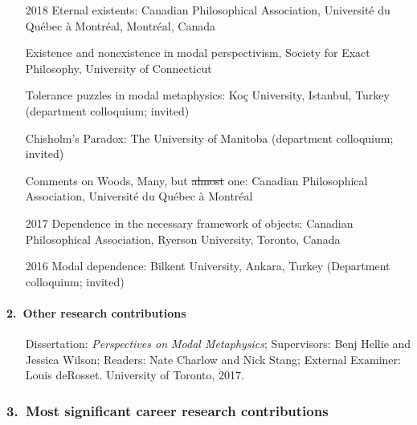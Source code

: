\documentclass[12pt]{article}
\begin{document}
\begin{itemize}
\item[{2018}] Eternal existents: Canadian Philosophical Association,
Universit\'e du Qu\'ebec \`a Montr\'eal, Montr\'eal, Canada 

\item[{\phantom}] Existence and nonexistence in modal perspectivism,
Society for Exact Philosophy, University of Connecticut

\item[{\phantom}] Tolerance puzzles in modal metaphysics: Ko\c c University,
Istanbul, Turkey (department colloquium; invited)

\item[{\phantom}] Chisholm's Paradox: The University of Manitoba
(department colloquium; invited)

\item[{\phantom}]  Comments on Woods, Many, but \st{almost} one: Canadian Philosophical
	Association, Universit\'e du Qu\'ebec \`a Montr\'eal  


\item [{2017}]  Dependence in the necessary framework of objects:
Canadian Philosophical Association, Ryerson University, Toronto, Canada  

\item [{2016}] Modal dependence: Bilkent University, Ankara, Turkey (Department
colloquium; invited) 

\end{itemize}

\paragraph{2.\ \quad Other research contributions}

\begin{itemize}

\item[] Dissertation: \emph{Perspectives on Modal Metaphysics}; Supervisors:
Benj Hellie and Jessica Wilson; Readers: Nate Charlow and Nick Stang; External
Examiner: Louis deRosset. University of Toronto, 2017.

\end{itemize}


\subsubsection*{3.\ \quad Most significant career research contributions}
	
\end{document}
